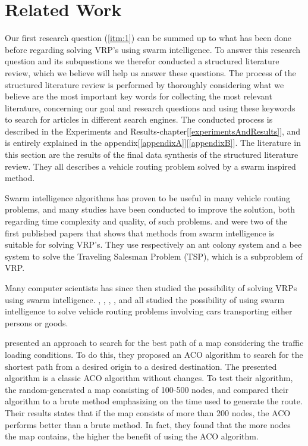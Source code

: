 \section{Related Work} 

Our first research question (\ref{itm:1}) can be summed up to what has been done before regarding solving VRP's using swarm intelligence. To answer this research question and its subquestions we therefor conducted a structured literature review, which we believe will help us answer these questions. The process of the structured literature review is performed by thoroughly considering what we believe are the most important key words for collecting the most relevant literature, concerning our goal and research questions and using these keywords to search for articles in different search engines. The conducted process is described in the Experiments and Results-chapter[\ref{experimentsAndResults}], and is entirely explained in the appendix[\ref{appendixA}][\ref{appendixB}]. The literature in this section are the results of the final data synthesis of the structured literature review. They all describes a vehicle routing problem solved by a swarm inspired method. \newline

Swarm intelligence algorithms has proven to be useful in many vehicle routing problems, and many studies have been conducted to improve the solution, both regarding time complexity and quality, of such problems. \citet{dorigo97} and \citet{lucic03} were two of the first published papers that shows that methods from swarm intelligence is suitable for solving VRP's. They use respectively an ant colony system and a bee system to solve the Traveling Salesman Problem (TSP), which is a subproblem of VRP. 

Many computer scientists has since then studied the possibility of solving VRPs using swarm intelligence. \citet{hsiao04}, \citet{salehi-nezhad07}, \citet{tripathi09}, \citet{dias14}, and \citet{sedighpour14} all studied the possibility of using swarm intelligence to solve vehicle routing problems involving cars transporting either persons or goods. 

\citet{hsiao04} presented an approach to search for the best path of a map considering the traffic loading conditions. To do this, they proposed an ACO algorithm to search for the shortest path from a desired origin to a desired destination. The presented algorithm is a classic ACO algorithm without changes. To test their algorithm, the random-generated a map consisting of 100-500 nodes, and compared their algorithm to a brute method emphasizing on the time used to generate the route. Their results states that if the map consists of more than 200 nodes, the ACO performs better than a brute method. In fact, they found that the more nodes the map contains, the higher the benefit of using the ACO algorithm. 


